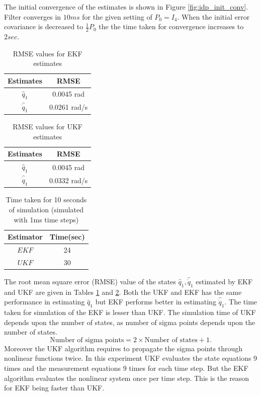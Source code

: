 The initial convergence of the estimates is shown in Figure \ref{fig:idp_init_conv}. Filter converges in $10ms$ for the given setting of $P_0=I_4$. When the initial error covariance is decreased to $\frac{1}{2}P_0$ the the time taken for convergence increases to $2 sec$. 

\begin{table}[H]
    \centering
    \begin{tabular}{|c|c|}
    \hline
    Estimates &RMSE \\ \hline
    $\hat q_1$   &0.0045 rad \\ \hline
    $\hat {\dot q}_1$ & 0.0261 rad/s \\ \hline
    \end{tabular}
    \caption{RMSE values for EKF estimates}
    \label{tab:idp_rmse_ekf}
\end{table}

\begin{table}[H]
    \centering
    \begin{tabular}{|c|c|}
    \hline
    Estimates &RMSE \\ \hline
    $\hat q_1$   &0.0045 rad \\ \hline
    $\hat {\dot q}_1$ & 0.0332 rad/s\\ \hline
    \end{tabular}
    \caption{RMSE values for UKF estimates}
    \label{tab:idp_rmse_ukf}
\end{table}

\begin{table}[H]
    \centering
    \begin{tabular}{|c|c|}
    \hline
    Estimator &Time(sec) \\ \hline
    $EKF$ &24 \\ \hline
    $UKF$ &30 \\ \hline
    \end{tabular}
    \caption{Time taken for 10 seconds of simulation (simulated with 1ms time steps)}
    \label{tab:idp_sim_time}
\end{table}
The root mean square error (RMSE) value of the states $\hat q_1, \hat{\dot q}_1 $ estimated by EKF and UKF are given in Tables \ref{tab:idp_rmse_ekf} and \ref{tab:idp_rmse_ukf}. Both the UKF and EKF has the same performance in estimating $\hat q_1$ but EKF performs better in estimating $\hat{\dot q}_1$. The time taken for simulation of the EKF is lesser than UKF. The simulation time of UKF depends upon the number of states, as number of sigma points depends upon the number of states. $$\text{Number of sigma points}=2\times \text{Number of states} +1.$$  Moreover the UKF algorithm requires to propagate the sigma points through nonlinear functions twice. In this experiment UKF evaluates the state equations 9 times and the measurement equations 9 times for each time step. But the EKF algorithm evaluates the nonlinear system once per time step. This is the reason for EKF being faster than UKF. 
